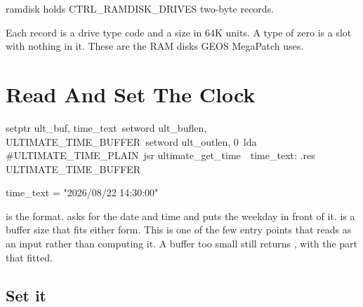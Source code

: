 \begin{resultbox}
ramdisk holds CTRL_RAMDISK_DRIVES two-byte records.
\end{resultbox}

Each record is a drive type code and a size in 64K units. A type of zero is a
slot with nothing in it. These are the RAM disks GEOS MegaPatch uses.


\section{Read And Set The Clock}

\begin{listingbox}
\hspace*{2em}setptr ult\_buf, time\_text\
\hspace*{2em}setword ult\_buflen, ULTIMATE\_TIME\_BUFFER\
\hspace*{2em}setword ult\_outlen, 0\
\hspace*{2em}lda \#ULTIMATE\_TIME\_PLAIN\
\hspace*{2em}jsr ultimate\_get\_time\
\
time\_text: .res ULTIMATE\_TIME\_BUFFER
\end{listingbox}

\begin{resultbox}
time_text = "2026/08/22 14:30:00"
\end{resultbox}

\cmd{A} is the format.  asks for the date and time
and  puts the weekday in front of it.
 is a buffer size that fits either form. This is
one of the few entry points that reads  as an input rather
than computing it. A buffer too small still returns , with
the part that fitted.

\subsection*{Set it}

